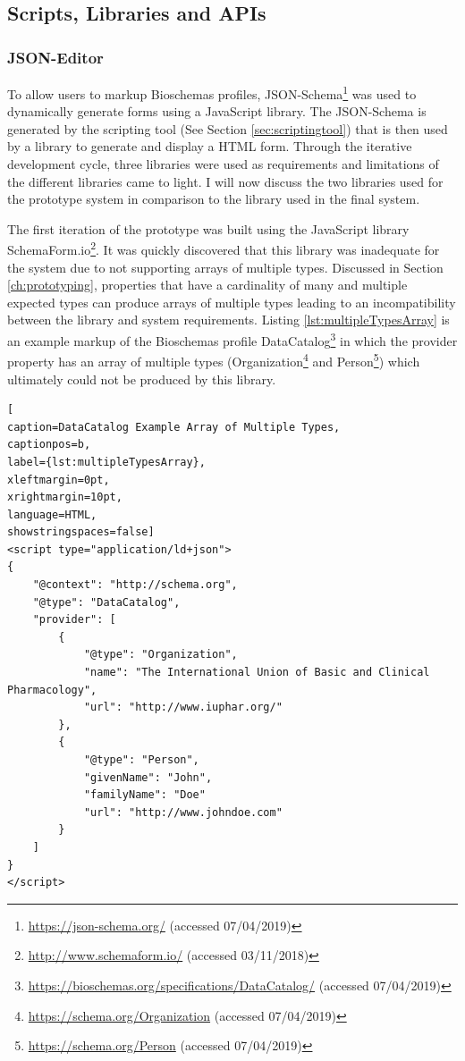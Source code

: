 \newpage
\subsection{Scripts, Libraries and APIs}\label{sec:libraries}

\subsubsection{JSON-Editor} \label{sec:jsoneditor}
To allow users to markup Bioschemas profiles, JSON-Schema\footnote{\url{https://json-schema.org/} (accessed 07/04/2019)} was used to dynamically generate forms using a JavaScript library. The JSON-Schema is generated by the scripting tool (See Section \ref{sec:scriptingtool}) that is then used by a library to generate and display a HTML form. Through the iterative development cycle, three libraries were used as requirements and limitations of the different libraries came to light. I will now discuss the two libraries used for the prototype system in comparison to the library used in the final system.

The first iteration of the prototype was built using the JavaScript library SchemaForm.io\footnote{\url{http://www.schemaform.io/} (accessed 03/11/2018)}. It was quickly discovered that this library was inadequate for the system due to not supporting arrays of multiple types. Discussed in Section \ref{ch:prototyping}, properties that have a cardinality of many and multiple expected types can produce arrays of multiple types leading to an incompatibility between the library and system requirements. Listing \ref{lst:multipleTypesArray} is an example markup of the Bioschemas profile DataCatalog\footnote{\url{https://bioschemas.org/specifications/DataCatalog/} (accessed 07/04/2019)} in which the provider property has an array of multiple types (Organization\footnote{\url{https://schema.org/Organization} (accessed 07/04/2019)} and Person\footnote{\url{https://schema.org/Person} (accessed 07/04/2019)}) which ultimately could not be produced by this library.

\vspace{1.5em}

{
\begin{center}
\begin{lstlisting}[
caption=DataCatalog Example Array of Multiple Types,
captionpos=b,
label={lst:multipleTypesArray},
xleftmargin=0pt,
xrightmargin=10pt,
language=HTML,
showstringspaces=false]
<script type="application/ld+json">
{
    "@context": "http://schema.org",
    "@type": "DataCatalog",
    "provider": [
        {
            "@type": "Organization",
            "name": "The International Union of Basic and Clinical Pharmacology",
            "url": "http://www.iuphar.org/"
        },
        {
            "@type": "Person",
            "givenName": "John",
            "familyName": "Doe"
            "url": "http://www.johndoe.com"
        }
    ]
}
</script>
\end{lstlisting}  
\end{center}
}


